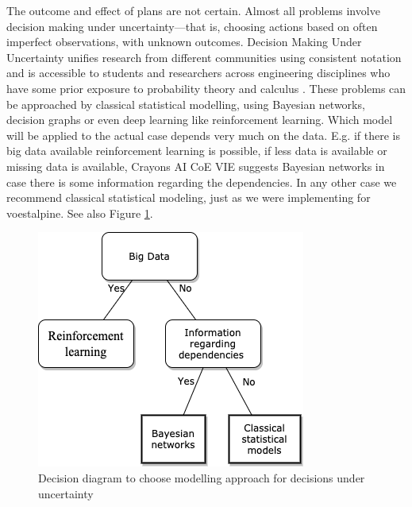 \documentclass[fleqn,10pt]{SelfArx} %
\begin{document}
The outcome and effect of plans are not certain. Almost all problems involve decision making under uncertainty—that is, choosing actions based on often imperfect observations, with unknown outcomes. Decision Making Under Uncertainty unifies research from different communities using consistent notation and is accessible to students and researchers across engineering disciplines who have some prior exposure to probability theory and calculus \cite{kochenderfer_amato_2015}.
These problems can be approached by classical statistical modelling, using Bayesian networks, decision graphs or even deep learning like reinforcement learning. Which model will be applied to the actual case depends very much on the data. E.g. if there is big data available reinforcement learning is possible, if less data is available or missing data is available, Crayons AI CoE VIE suggests Bayesian networks in case there is some information regarding the dependencies. In any other case we recommend classical statistical modeling, just as we were implementing for voestalpine. See also Figure \ref{models}.

\begin{figure}[ht]\centering
\includegraphics[width=\linewidth]{modeldecision.png}
\caption{Decision diagram to choose modelling approach for decisions under uncertainty}
\label{models}
\end{figure}




\end{document}
